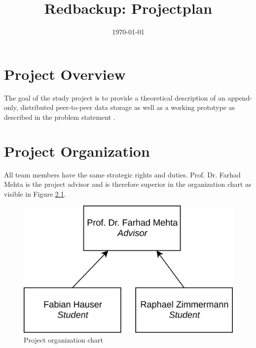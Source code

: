 

\usepackage{tabu}
\usepackage{rotating}
\usepackage{diagbox}
\usepackage{float}
\usepackage{multicol}
\usepackage{rotating}
\usepackage{url}

\title{Redbackup: Projectplan}

\date{\today}



\begin{DIFnomarkup}
\frontmatter

\maketitle


\tableofcontents %

\end{DIFnomarkup}
\mainmatter
\chapter{Project Overview}
The goal of the study project is to provide a theoretical description of an append-only, distributed peer-to-peer data storage as well as a working prototype as described in the problem statement \cite{problemstatement}.


\chapter{Project Organization}

All team members have the same strategic rights and duties. Prof. Dr. Farhad Mehta is the project advisor and is therefore superior in the organization chart as visible in Figure \ref{fig:organigram}.

\begin{figure}[H]
	\centering
	\includegraphics[width=0.5\linewidth]{resources/organigram}
	\caption[Organigram]{Project organization chart}
	\label{fig:organigram}
\end{figure}

